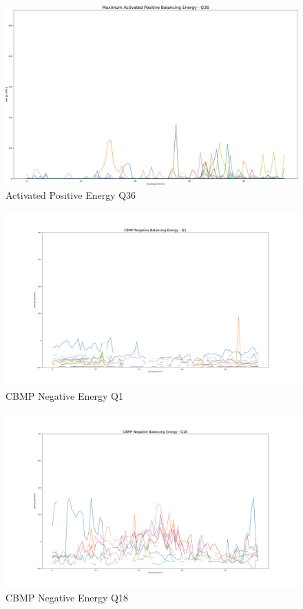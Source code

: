 \begin{figure}[H]
	\includegraphics[width=1\linewidth]{pictures/results/Activated_posEnergy_Q36.png}
	\caption{Activated Positive Energy Q36}
	\label{fig:_posEnergy_Q36}
\end{figure}



\begin{figure}[H]
	\centering
	\includegraphics[width=1\linewidth]{pictures/results/CBMP_negBal_Q1.png}
	\caption{CBMP Negative Energy Q1}
	\label{fig:CBMP_negBal_Q1}
\end{figure}


\begin{figure}[H]
	\centering
	\includegraphics[width=1\linewidth]{pictures/results/CBMP_negBal_Q18.png}
	\caption{CBMP Negative Energy Q18}
	\label{fig:CBMP_negBal_Q18}
\end{figure}



